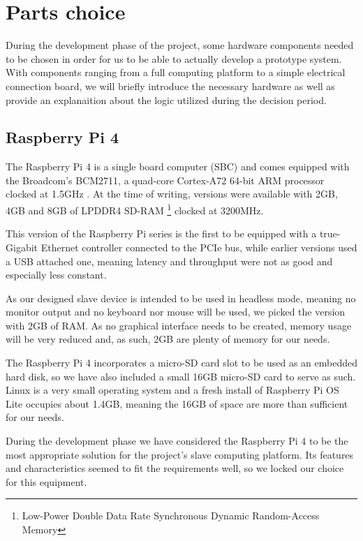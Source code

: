 \section{Parts choice} \label{sec:parts_choice}
During the development phase of the project, some hardware components needed to be chosen in order for us to be able to actually develop a prototype system.
With components ranging from a full computing platform to a simple electrical connection board, we will briefly introduce the necessary hardware as well as provide an explanaition about the logic utilized during the decision period.


\subsection{Raspberry Pi 4} \label{subsec:rpi4}
The Raspberry Pi 4 is a single board computer (SBC) and comes equipped with the Broadcom's BCM2711, a quad-core Cortex-A72 64-bit ARM processor clocked at 1.5GHz \cite{technology:rpi4-specs}.
At the time of writing, versions were available with 2GB, 4GB and 8GB of LPDDR4 SD-RAM \footnote{Low-Power Double Data Rate Synchronous Dynamic Random-Access Memory} clocked at 3200MHz.

This version of the Raspberry Pi series is the first to be equipped with a true-Gigabit Ethernet controller connected to the PCIe bus, while earlier versions used a USB attached one, meaning latency and throughput were not as good and especially less constant.

As our designed slave device is intended to be used in headless mode, meaning no monitor output and no keyboard nor mouse will be used, we picked the version with 2GB of RAM.
As no graphical interface needs to be created, memory usage will be very reduced and, as such, 2GB are plenty of memory for our needs.

The Raspberry Pi 4 incorporates a micro-SD card slot to be used as an embedded hard disk, so we have also included a small 16GB micro-SD card to serve as such.
Linux is a very small operating system and a fresh install of Raspberry Pi OS Lite occupies about 1.4GB, meaning the 16GB of space are more than sufficient for our needs.

During the development phase we have considered the Raspberry Pi 4 to be the most appropriate solution for the project's slave computing platform.
Its features and characteristics seemed to fit the requirements well, so we locked our choice for this equipment.

